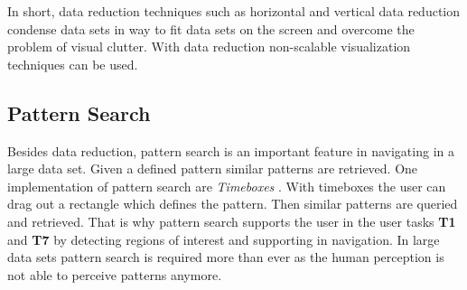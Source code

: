 In short, data reduction techniques such as horizontal and vertical data reduction condense  data sets in way to fit data sets on the screen and overcome the problem of visual clutter. With data reduction non-scalable visualization techniques can be used. 


\subsection{Pattern Search}\label{patternsearch}
Besides data reduction, pattern search is an important feature in navigating in a large data set. Given a defined pattern similar patterns are retrieved. One implementation of pattern search are \textit{Timeboxes}  \cite{Buono2005}. With timeboxes the user can drag out a rectangle which defines the pattern. Then similar patterns are queried and retrieved. That is why pattern search supports the user in the user tasks \textbf{T1} and \textbf{T7} by detecting regions of interest and supporting in navigation. In large data sets pattern search is required more than ever as the human perception is not able to perceive patterns anymore.


